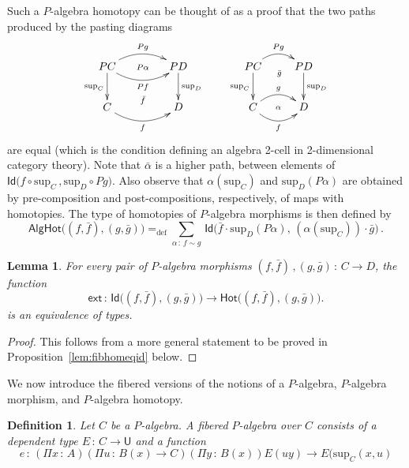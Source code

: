 \documentclass[10pt,a4paper,oneside,reqno]{amsart}
\theoremstyle{mythm}
\newtheorem{lemma}[theorem]{Lemma}
\theoremstyle{mydef}
\newtheorem{definition}[theorem]{Definition}
\theoremstyle{myrmk}
\newcommand{\defeq}{=_{\mathrm{def}}}
\newcommand{\co}{\,{:}\,}
\newcommand{\Hot}{\mathsf{Hot}}
\newcommand{\ext}{\mathsf{ext}}
\newcommand{\Id}{\mathsf{Id}}
\newcommand{\U}{\mathsf{U}}
\renewcommand{\sup}{\mathrm{sup}}
\newcommand{\AlgHot}{\mathsf{AlgHot}}
\begin{document}
Such a $P$-algebra homotopy can be thought of as a proof that the two paths produced by the pasting diagrams
\[
\xymatrix@C=1.5cm{
PC \ar@/^1pc/[r]^{Pg}   \ar[d]_{\sup_C}   \ar@/_1pc/[r]_{Pf} \ar@{}[r]|{P\alpha}
& PD \ar[d]^{\sup_D}  \\
C  \ar@/_1pc/[r]_f  \ar@{}[r]^{\bar{f}} & D }
\qquad
\xymatrix{
PC \ar@/^1pc/[r]^{Pg}   \ar[d]_{\sup_C} \ar@{}[r]_(.52){\bar{g}}  & PD \ar[d]^{\sup_D}  \\
C \ar@/^1pc/[r]^g  \ar@/_1pc/[r]_f  \ar@{}[r]|{\alpha} & D }
\]
are equal (which is the condition defining an algebra 2-cell in 2-dimensional category theory). Note that $\bar{\alpha}$ is a higher path, between elements of 
$\Id \big( f \circ \sup_C \, ,  \sup_D \circ Pg \big)$. Also observe that $\alpha(\sup_C)$ and $\sup_D(P \alpha)$ are obtained by pre-composition and post-compositions, respectively, of maps with homotopies.  The type of homotopies of $P$-algebra morphisms is then defined by
\[
\AlgHot \big( (f,\bar{f}), (g, \bar{g})  \big)
 \defeq  
\sum_{\alpha \co  f \sim g} \, \Id\big( \bar{f} \cdot \sup_D(P \alpha),\, (\alpha(\sup_C))\cdot \bar{g} \big) \, .
\]




\begin{lemma}\label{IdEqHo}
For every pair of $P$-algebra morphisms $(f, \bar{f}) \, , (g, \bar{g}) \co C \to D$,  
the function
\[
\ext \co 
\Id\big((f, \bar{f}), (g, \bar{g})\big) \to \Hot \big((f, \bar{f}), (g, \bar{g})\big).
\]
 is an equivalence of types. 
\end{lemma}

\begin{proof}
This follows from a more general statement to be proved in Proposition~\ref{lem:fibhomeqid} below.
\end{proof}


We now introduce the fibered versions of the notions of a $P$-algebra, $P$-algebra morphism, and $P$-algebra homotopy.

\begin{definition} \label{def:fibalg}
Let $C$ be a $P$-algebra. A \emph{fibered $P$-algebra} over $C$ consists of a dependent type $E \co C \to \U$
and a function 
\[
e \co  (\Pi x \co A) (\Pi u \co B(x) \to C)   (\Pi y \co B(x))   E(u y)   \to E(\sup_C(x,u) 
 \] 
\end{definition}
\end{document}
